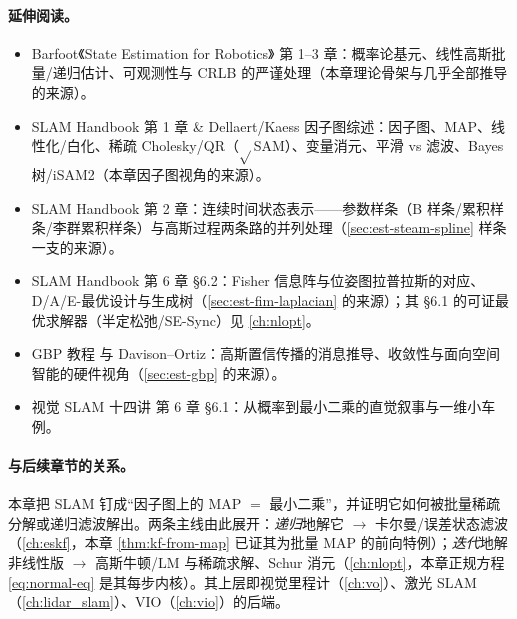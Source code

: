 \paragraph{延伸阅读。}
\begin{itemize}
  \item Barfoot《State Estimation for Robotics》\cite{barfoot2024state} 第 1--3 章：概率论基元、线性高斯批量/递归估计、可观测性与 CRLB 的严谨处理（本章理论骨架与几乎全部推导的来源）。
  \item SLAM Handbook\cite{carlone2026handbook} 第 1 章 \& Dellaert/Kaess 因子图综述\cite{dellaert2017factor}：因子图、MAP、线性化/白化、稀疏 Cholesky/QR（$\sqrt{}$SAM）、变量消元、平滑 vs 滤波、Bayes 树/iSAM2（本章因子图视角的来源）。
  \item SLAM Handbook\cite{carlone2026handbook} 第 2 章：连续时间状态表示——参数样条（B 样条/累积样条/李群累积样条）与高斯过程两条路的并列处理（\cref{sec:est-steam-spline} 样条一支的来源）。
  \item SLAM Handbook\cite{carlone2026handbook} 第 6 章 §6.2：Fisher 信息阵与位姿图拉普拉斯的对应、D/A/E-最优设计与生成树（\cref{sec:est-fim-laplacian} 的来源）；其 §6.1 的可证最优求解器（半定松弛/SE-Sync）见 \cref{ch:nlopt}。
  \item GBP 教程\cite{ortiz2021gbp} 与 Davison–Ortiz\cite{davison2019futuremapping2}：高斯置信传播的消息推导、收敛性与面向空间智能的硬件视角（\cref{sec:est-gbp} 的来源）。
  \item 视觉 SLAM 十四讲\cite{gaoxiang2019slam14} 第 6 章 §6.1：从概率到最小二乘的直觉叙事与一维小车例。
\end{itemize}

\paragraph{与后续章节的关系。}
本章把 SLAM 钉成“因子图上的 MAP $=$ 最小二乘”，并证明它如何被批量稀疏分解或递归滤波解出。两条主线由此展开：\emph{递归}地解它 $\to$ 卡尔曼/误差状态滤波（\cref{ch:eskf}，本章 \cref{thm:kf-from-map} 已证其为批量 MAP 的前向特例）；\emph{迭代}地解非线性版 $\to$ 高斯牛顿/LM 与稀疏求解、Schur 消元（\cref{ch:nlopt}，本章正规方程 \cref{eq:normal-eq} 是其每步内核）。其上层即视觉里程计（\cref{ch:vo}）、激光 SLAM（\cref{ch:lidar_slam}）、VIO（\cref{ch:vio}）的后端。

